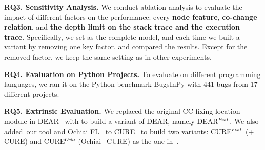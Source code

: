 {\bf RQ3. Sensitivity Analysis.}  We conduct ablation
analysis to evaluate the impact of different factors on the
performance: every {\bf node feature}, {\bf co-change
relation}, and {\bf the depth limit on the stack trace and the
execution trace}. Specifically, we set {\tool} as the complete model,
and each time we built a variant by removing one key factor,
and compared the results.
Except for the removed factor, we keep the same setting
as in other experiments.

{\bf RQ4. Evaluation on Python Projects.}
%
To evaluate {\tool} on different programming languages, we ran it on the Python benchmark BugsInPy \cite{BugsInPy,widyasari2020bugsinpy} with 441 bugs from 17 different projects.



{\bf RQ5. Extrinsic Evaluation.}
We replaced the original CC fixing-location module in
DEAR~\cite{icse22} with {\tool} to build a variant of DEAR, namely DEAR$^{FixL}$. 
We also added~our tool and Ochiai FL~\cite{Ochiai} to
CURE~\cite{cure-icse21} to build two variants: CURE$^{FixL}$ (\tool + CURE) and CURE$^{Ochi}$ (Ochiai+CURE) as the one in~\cite{icse22}. 



